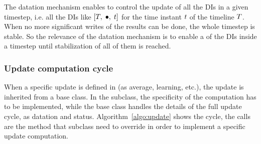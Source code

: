 The datation mechanism enables to control the update of all the DIs in a given timestep, i.e. all the DIs like $\left[ T,\;\bullet,\;t \right]$ for the time instant $t$ of the timeline $T$. When no more significant writes of the results can be done, the whole timestep is stable. So the relevance of the datation mechanism is to enable a  of the DIs inside a timestep until stabilization of all of them is reached.



\subsubsection{Update computation cycle}

When a specific update is defined in \CxSOM (as average, learning, etc.), the update is inherited from a base  class. In the subclass, the specificity of the computation has to be implemented, while the base class handles the details of the full update cycle, as datation and status. Algorithm~\ref{algo:update} shows the cycle, the  calls are the method that subclass need to override in order to implement a specific update computation.


